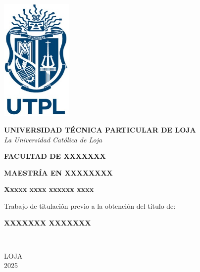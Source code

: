 \begin{center}
    
    \includegraphics[width=3.5cm]{figures/logo_utpl.jpg} %
    
    \vspace{1cm}
    
    {\Large \textbf{UNIVERSIDAD TÉCNICA PARTICULAR DE LOJA}}\\
    {\large \textit{La Universidad Católica de Loja}}
    
    \vspace{1cm}
    
    {\large \textbf{FACULTAD DE XXXXXXX}}
    
    \vspace{1cm}
    
    {\large \textbf{MAESTRÍA EN XXXXXXXX}}
    
    \vspace{1cm}
    
    {\Large \textbf{Xxxxx xxxx xxxxxx xxxx}}
    
    \vspace{1cm}
    
    {\large Trabajo de titulación previo a la obtención del título de:}
    
    \vspace{1cm}
    
    {\large \textbf{XXXXXXX XXXXXXX}}
    
    \vspace{2cm}
    
    \begin{flushleft}
    \\
    \vspace{0.5cm}
    \end{flushleft}
    
    \vfill
    
    {\large LOJA}\\
    {\large 2025}
    
    \end{center}